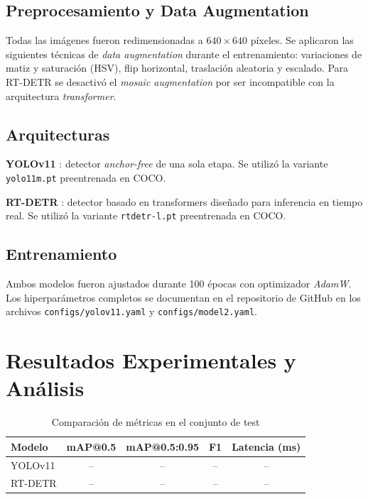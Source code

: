 \documentclass[conference]{IEEEtran}
\begin{document}
\subsection{Preprocesamiento y Data Augmentation}

Todas las imágenes fueron redimensionadas a $640 \times 640$ píxeles. Se
aplicaron las siguientes técnicas de \textit{data augmentation} durante
el entrenamiento: variaciones de matiz y saturación (HSV), flip horizontal,
traslación aleatoria y escalado. Para RT-DETR se desactivó el \textit{mosaic
augmentation} por ser incompatible con la arquitectura \textit{transformer}.

\subsection{Arquitecturas}

\textbf{YOLOv11} \cite{b3}: detector \textit{anchor-free} de una sola etapa.
Se utilizó la variante \texttt{yolo11m.pt} preentrenada en COCO.

\textbf{RT-DETR} \cite{b4}: detector basado en transformers diseñado para
inferencia en tiempo real. Se utilizó la variante \texttt{rtdetr-l.pt}
preentrenada en COCO.

\subsection{Entrenamiento}

Ambos modelos fueron ajustados durante 100 épocas con optimizador
\textit{AdamW}. Los hiperparámetros completos se documentan en el repositorio
de GitHub en los archivos \texttt{configs/yolov11.yaml} y
\texttt{configs/model2.yaml}.

\section{Resultados Experimentales y Análisis}


\begin{table}[htbp]
\caption{Comparación de métricas en el conjunto de test}
\begin{center}
\begin{tabular}{lcccc}
\toprule
\textbf{Modelo} & \textbf{mAP@0.5} & \textbf{mAP@0.5:0.95} & \textbf{F1} & \textbf{Latencia (ms)} \\
\midrule
YOLOv11  & -- & -- & -- & -- \\
RT-DETR  & -- & -- & -- & -- \\
\bottomrule
\end{tabular}
\end{center}
\end{table}
\end{document}

